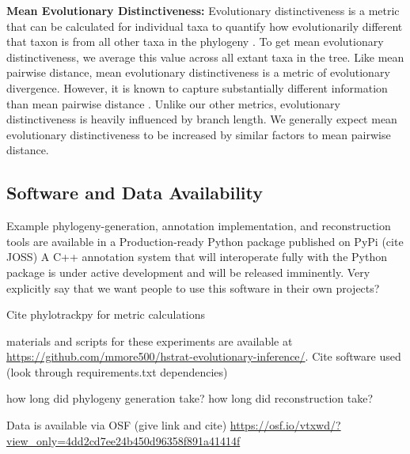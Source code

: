 \textbf{Mean Evolutionary Distinctiveness:} Evolutionary distinctiveness is a metric that can be calculated for individual taxa to quantify how evolutionarily different that taxon is from all other taxa in the phylogeny \citep{isaacMammalsEDGEConservation2007}. To get mean evolutionary distinctiveness, we average this value across all extant taxa in the tree. Like mean pairwise distance, mean evolutionary distinctiveness is a metric of evolutionary divergence. However, it is known to capture substantially different information than mean pairwise distance \citep{tuckerGuidePhylogeneticMetrics2017}. Unlike our other metrics, evolutionary distinctiveness is heavily influenced by branch length. We generally expect mean evolutionary distinctiveness to be increased by similar factors to mean pairwise distance.


\subsection{Software and Data Availability}

Example phylogeny-generation, annotation implementation, and reconstruction tools are available in a Production-ready Python package published on PyPi (cite JOSS) A C++ annotation system that will interoperate fully with the Python package is under active development and will be released imminently.
Very explicitly say that we want people to use this software in their own projects?

Cite phylotrackpy for metric calculations

materials and scripts for these experiments are available at \url{https://github.com/mmore500/hstrat-evolutionary-inference/}. Cite software used (look through requirements.txt dependencies)

how long did phylogeny generation take? how long did reconstruction take?

Data is available via OSF (give link and cite) 
\url{https://osf.io/vtxwd/?view_only=4dd2cd7ee24b450d96358f891a41414f}
